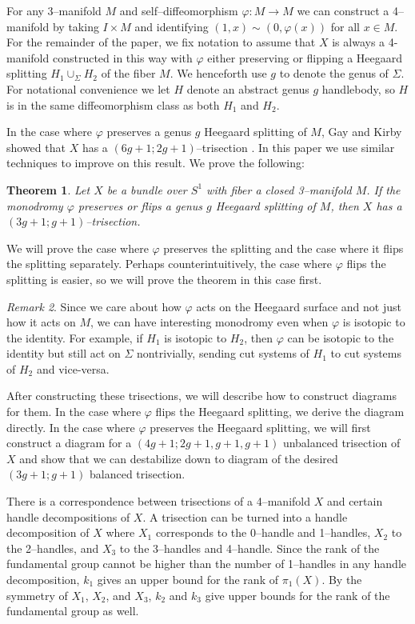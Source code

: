 \documentclass[12pt]{amsart}
\newtheorem{thm}{Theorem}
\theoremstyle{definition}
\theoremstyle{remark}
\newtheorem{rem}[thm]{Remark}
\begin{document}
For any 3--manifold $M$ and self--diffeomorphism $\varphi \colon M \to M$ we can construct a 4--manifold by taking $I \times M$ and identifying $(1,x) \sim (0,\varphi(x))$ for all $x \in M$.
For the remainder of the paper, we fix notation to assume that $X$ is always a 4-manifold constructed in this way with $\varphi$ either preserving or flipping a Heegaard splitting $H_1 \cup_\Sigma H_2$ of the fiber $M$.
We henceforth use $g$ to denote the genus of $\Sigma$.
For notational convenience we let $H$ denote an abstract genus $g$ handlebody, so $H$ is in the same diffeomorphism class as both $H_1$ and $H_2$.

In the case where $\varphi$ preserves a genus $g$ Heegaard splitting of $M$, Gay and Kirby showed that $X$ has a $(6g+1;2g+1)$--trisection \cite{GayKirby1}.
In this paper we use similar techniques to improve on this result.
We prove the following:

\begin{thm}
\label{mainresult}
Let $X$ be a bundle over $S^1$ with fiber a closed 3--manifold $M$.
If the monodromy $\varphi$ preserves or flips a genus $g$ Heegaard splitting of $M$, then $X$ has a $(3g+1;g+1)$--trisection.
\end{thm}

We will prove the case where $\varphi$ preserves the splitting and the case where it flips the splitting separately.
Perhaps counterintuitively, the case where $\varphi$ flips the splitting is easier, so we will prove the theorem in this case first.

\begin{rem}
Since we care about how $\varphi$ acts on the Heegaard surface and not just how it acts on $M$, we can have interesting monodromy even when $\varphi$ is isotopic to the identity.
For example, if $H_1$ is isotopic to $H_2$, then $\varphi$ can be isotopic to the identity but still act on $\Sigma$ nontrivially, sending cut systems of $H_1$ to cut systems of $H_2$ and vice-versa.
\end{rem}

After constructing these trisections, we will describe how to construct diagrams for them.
In the case where $\varphi$ flips the Heegaard splitting, we derive the diagram directly.
In the case where $\varphi$ preserves the Heegaard splitting, we will first construct a diagram for a $(4g+1;2g+1,g+1,g+1)$ unbalanced trisection of $X$ and show that we can destabilize down to diagram of the desired $(3g+1;g+1)$ balanced trisection.

There is a correspondence between trisections of a 4--manifold $X$ and certain handle decompositions of $X$.
A trisection can be turned into a handle decomposition of $X$ where $X_1$ corresponds to the 0--handle and 1--handles, $X_2$ to the 2--handles, and $X_3$ to the 3--handles and 4--handle.
Since the rank of the fundamental group cannot be higher than the number of 1--handles in any handle decomposition, $k_1$ gives an upper bound for the rank of $\pi_1(X)$.
By the symmetry of $X_1$, $X_2$, and $X_3$, $k_2$ and $k_3$ give upper bounds for the rank of the fundamental group as well.
\end{document}

